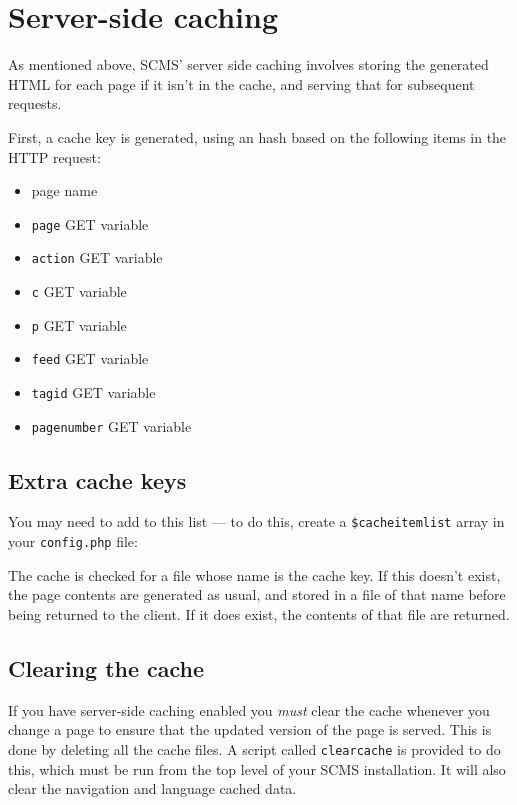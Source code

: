 \section{Server-side caching}
As mentioned above, SCMS' server side caching involves storing the generated HTML for each page
if it isn't in the cache, and serving that for subsequent requests.

First, a cache key is generated, using an hash
based on the following items in the HTTP request:
\begin{itemize}
\item page name
\item \texttt{page} GET variable
\item \texttt{action} GET variable
\item \texttt{c} GET variable
\item \texttt{p} GET variable
\item \texttt{feed} GET variable
\item \texttt{tagid} GET variable
\item \texttt{pagenumber} GET variable
\end{itemize}
\subsection{Extra cache keys}
You may need to add to this list --- to do this, create a \verb+$cacheitemlist+ array
in your \verb+config.php+ file:

The cache is checked for a file whose name is the cache key. If this doesn't exist, the page contents
are generated as usual, and stored in a file of that name before being returned to the client. If it does
exist, the contents of that file are returned.

\subsection{Clearing the cache}
If you have server-side caching enabled you \emph{must} clear the cache
whenever you change a page to ensure that the updated version of the page is
served. This is done by deleting all the cache files. A script called
\texttt{clearcache} is provided to do this, which must be run from the top
level of your SCMS installation. It will also clear the navigation and
language cached data.

